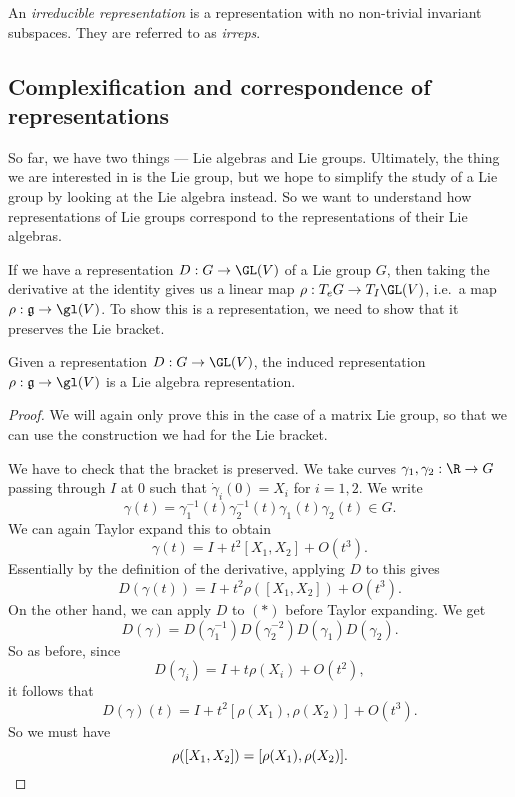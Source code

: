 \documentclass[a4paper]{article}
\begin{document}
\begin{defi}
  An \emph{irreducible representation} is a representation with no non-trivial invariant subspaces. They are referred to as \emph{irreps}.
\end{defi}

\subsection{Complexification and correspondence of representations}
So far, we have two things --- Lie algebras and Lie groups. Ultimately, the thing we are interested in is the Lie group, but we hope to simplify the study of a Lie group by looking at the Lie algebra instead. So we want to understand how representations of Lie groups correspond to the representations of their Lie algebras.

If we have a representation $D: G \to \GL(V)$ of a Lie group $G$, then taking the derivative at the identity gives us a linear map $\rho: T_e G \to T_I \GL(V)$, i.e.\ a map $\rho: \mathfrak{g} \to \gl(V)$. To show this is a representation, we need to show that it preserves the Lie bracket.

\begin{lemma}
  Given a representation $D: G \to \GL(V)$, the induced representation $\rho: \mathfrak{g} \to \gl(V)$ is a Lie algebra representation.
\end{lemma}

\begin{proof}
  We will again only prove this in the case of a matrix Lie group, so that we can use the construction we had for the Lie bracket.

  We have to check that the bracket is preserved. We take curves $\gamma_1, \gamma_2: \R \to G$ passing through $I$ at $0$ such that $\dot{\gamma}_i(0) = X_i$ for $i = 1, 2$. We write
  \[
    \gamma(t) = \gamma_1^{-1}(t) \gamma_2^{-1}(t)\gamma_1(t)\gamma_2(t) \in G.
  \]
  We can again Taylor expand this to obtain
  \[
    \gamma(t) = I + t^2 [X_1, X_2] + O(t^3).
  \]
  Essentially by the definition of the derivative, applying $D$ to this gives
  \[
    D(\gamma(t)) = I + t^2 \rho([X_1, X_2]) + O(t^3).
  \]
  On the other hand, we can apply $D$ to $(*)$ before Taylor expanding. We get
  \[
    D(\gamma) = D(\gamma_1^{-1}) D(\gamma_2^{-2}) D(\gamma_1) D(\gamma_2).
  \]
  So as before, since
  \[
    D(\gamma_i) = I + t \rho(X_i) + O(t^2),
  \]
  it follows that
  \[
    D(\gamma)(t) = I + t^2 [\rho(X_1), \rho(X_2)] + O(t^3).
  \]
  So we must have
  \[
    \rho([X_1, X_2]) = [\rho(X_1), \rho(X_2)]. \qedhere
  \]
\end{proof}
\end{document}

